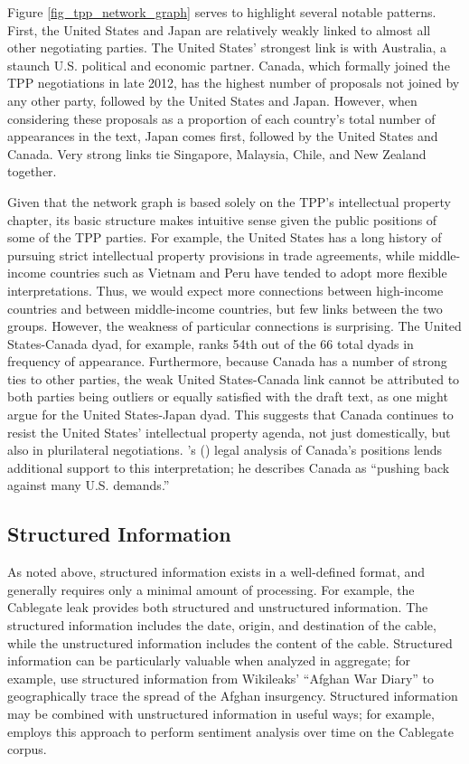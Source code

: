 \documentclass[12pt]{article}
\def\citeapos#1{\citeauthor{#1}'s (\citeyear{#1})} %
\begin{document}
Figure \ref{fig_tpp_network_graph} serves to highlight several notable patterns. First, the 
United States and Japan are relatively 
weakly linked to almost all other negotiating parties. The United States' strongest link is with 
Australia, a staunch U.S. political and economic partner. Canada, which formally joined the TPP 
negotiations in late 2012, has the highest number of proposals not joined by any other party, followed 
by the United States and Japan. However, when considering these proposals as a proportion of each 
country's total number of appearances in the text, Japan comes first, followed by the United States 
and Canada. Very strong links tie Singapore, Malaysia, Chile, and New Zealand together.

Given that the network graph is based solely on the TPP's intellectual property chapter, 
its basic structure makes intuitive sense given the public positions of some of the TPP parties. 
For example, the United States has a long history of pursuing strict intellectual property provisions 
in trade agreements, while middle-income countries such as Vietnam and Peru have tended to adopt more 
flexible interpretations. Thus, we would expect more connections between high-income countries and between 
middle-income countries, but few links between the two groups. However, the weakness of particular 
connections is surprising. The United States-Canada dyad, 
for example, ranks 54th out of the 66 total dyads in frequency of appearance. Furthermore, because Canada has a 
number of strong ties to other parties, the weak United States-Canada link cannot be attributed to 
both parties being outliers or equally satisfied with the draft text, as one might argue for the 
United States-Japan dyad. This suggests that Canada continues to resist the United States' intellectual property 
agenda, not just domestically, but also in plurilateral negotiations. \citeapos{michael_geist2013trans} legal analysis of Canada's positions lends additional 
support to this interpretation; he describes Canada as ``pushing back against many U.S. demands.''

\subsection{Structured Information}

As noted above, structured information exists in a well-defined format, and generally requires only 
a minimal amount of processing. For example, the Cablegate leak provides both structured and 
unstructured information. The structured information includes 
the date, origin, and destination of the cable, while the unstructured information includes the content 
of the cable.
Structured information can be particularly valuable when analyzed 
in aggregate; for example, \citet{oloughlin2010peering} use structured information from Wikileaks' ``Afghan 
War Diary'' to geographically trace the spread of the Afghan insurgency. Structured information may be 
combined with unstructured information in useful ways; for example, \citet{paruchuri2012tracking} employs this 
approach to perform sentiment analysis over time on the Cablegate corpus.
\end{document}
